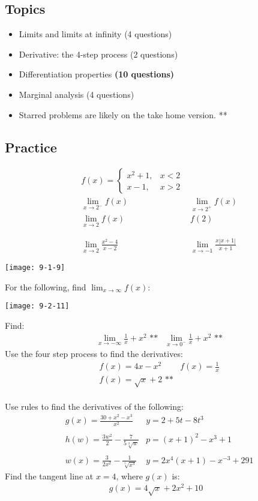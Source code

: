 \documentclass[14pt]{extarticle}
\begin{document}
\subsection{Topics}
\begin{itemize}
	\item Limits and limits at infinity (4 questions)
	\item Derivative: the 4-step process (2 questions)
	\item Differentiation properties \textbf{(10 questions)}
	\item Marginal analysis (4 questions)
	\item Starred problems are likely on the take home version. **
\end{itemize}

\subsection{Practice}
\begin{align*}
	&f(x) =
	\begin{cases}
		x^2+1,  & x <2\\
		x-1, & x>2
	\end{cases} \\
	&\lim_{x \to 2^-} f(x)
	&\lim_{x \to 2^+} f(x)	\\
	&\lim_{x \to 2} f(x)
	&f(2)
	\\\\\\
	&\lim_{x\to 2} \frac{x^2-4}{x-2}	&\lim_{x\to -1}\frac{x|x+1|}{x+1}
\end{align*}
\begin{center}
	\texttt{[image: 9-1-9]}
\end{center}

\cleardoublepage
For the following, find $\lim_{x\to \infty}f(x):$
\begin{center}
	\texttt{[image: 9-2-11]}
\end{center}
Find:
\begin{align*}	
	&\lim_{x \to -\infty}\frac{1}{x}  + x^2 \text{ **}	
	&\lim_{x \to 0^-}\frac{1}{x}  + x^2 \text{ **}
\end{align*}
Use the four step process to find the derivatives:
\begin{align*}
	&f(x) = 4x - x^2
	&f(x) = \frac{1}{x}\\
	&f(x) = \sqrt{x}+2 \text{ **}
\end{align*}
\\
Use rules to find the derivatives of the following:
\begin{align*}
	&g(x)= \frac{30 + x^2 - x^3}{x^2}
	&y = 2 + 5t - 8t^3
	\\\\
	&h(w) = \frac{3w^2}{2} - \frac{7}{5\sqrt[3]{w}}
	&p=(x+1)^2 - x^3 +1
	\\\\
	&w(x) = \frac{3}{2x^2} - \frac{1}{\sqrt[5]{x^3}}
	&y=2x^4(x+1) - x^{-3} +291
\end{align*}
Find the tangent line at $x=4$, where $g(x)$ is:
\begin{align*}
	g(x) = 4\sqrt{x} + 2x^2 +10
\end{align*}
\end{document}
